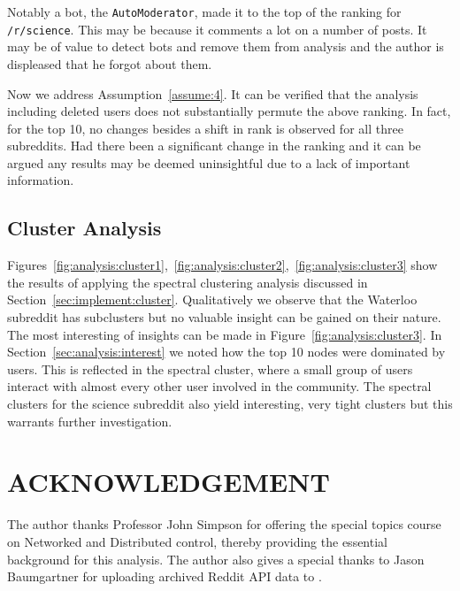 \documentclass[letterpaper, 10 pt, conference]{ieeeconf}
\theoremstyle{definition}
\begin{document}
Notably a bot, the \texttt{AutoModerator}, made it to the top of the ranking for \texttt{/r/science}. This may be because it comments a lot on a number of posts. It may be of value to detect bots and remove them from analysis and the author is displeased that he forgot about them.

Now we address Assumption~\ref{assume:4}. It can be verified that the analysis including deleted users does not substantially permute the above ranking. In fact, for the top 10, no changes besides a shift in rank is observed for all three subreddits. Had there been a significant change in the ranking and it can be argued any results may be deemed uninsightful due to a lack of important information.

\subsection{Cluster Analysis}
Figures~\ref{fig:analysis:cluster1},~\ref{fig:analysis:cluster2},~\ref{fig:analysis:cluster3} show the results of applying the spectral clustering analysis discussed in Section~\ref{sec:implement:cluster}. Qualitatively we observe that the Waterloo subreddit has subclusters but no valuable insight can be gained on their nature. The most interesting of insights can be made in Figure~\ref{fig:analysis:cluster3}. In Section~\ref{sec:analysis:interest} we noted how the top 10 nodes were dominated by users. This is reflected in the spectral cluster, where a small group of users interact with almost every other user involved in the community. The spectral clusters for the science subreddit also yield interesting, very tight clusters but this warrants further investigation.

\section*{ACKNOWLEDGEMENT}
The author thanks Professor John Simpson for offering the special topics course on Networked and Distributed control, thereby providing the essential background for this analysis. The author also gives a special thanks to Jason Baumgartner for uploading archived Reddit API data to \cite{Software:RedditArchive}.


\end{document}
